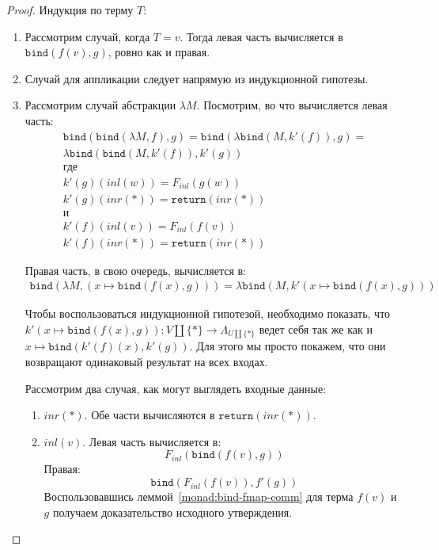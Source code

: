 \begin{proof}
  Индукция по терму $T$:
  \begin{enumerate}
    \item Рассмотрим случай, когда $T = v$. Тогда левая часть вычисляется в $\texttt{bind}(f(v), g)$, ровно как и правая.
    \item Случай для аппликации следует напрямую из индукционной гипотезы.
    \item Рассмотрим случай абстракции $\lambda M$. Посмотрим, во что вычисляется левая часть:
    \begin{gather*}
      \texttt{bind}(\texttt{bind}(\lambda M, f), g) = \texttt{bind}(\lambda \texttt{bind}(M, k'(f)), g) = \\
      \lambda \texttt{bind}(\texttt{bind}(M, k'(f)), k'(g)) \\
      \text{где} \\
      k'(g)(inl(w)) = F_{inl}(g(w)) \\
      k'(g)(inr(*)) = \texttt{return}(inr(*)) \\
      \text{и} \\
      k'(f)(inl(v)) = F_{inl}(f(v)) \\
      k'(f)(inr(*)) = \texttt{return}(inr(*))
    \end{gather*}

    Правая часть, в свою очередь, вычисляется в:
    \begin{gather*}
      \texttt{bind}(\lambda M, (x \mapsto \texttt{bind}(f(x), g))) = \lambda \texttt{bind}(M, k'(x \mapsto \texttt{bind}(f(x), g)))
    \end{gather*}

    Чтобы воспользоваться индукционной гипотезой, необходимо показать, что $k'(x \mapsto \texttt{bind}(f(x), g)) : V \coprod \{*\} \to \Lambda_{U \coprod \{*\}}$ ведет себя так же как и $x \mapsto \texttt{bind}(k'(f)(x), k'(g))$. Для этого мы просто покажем, что они возвращают одинаковый результат на всех входах.

    Рассмотрим два случая, как могут выглядеть входные данные:
    \begin{enumerate}
      \item $inr(*)$. Обе части вычисляются в $\texttt{return}(inr(*))$.
      \item $inl(v)$. Левая часть вычисляется в: $$ F_{inl}(\texttt{bind}(f(v), g)) $$
      Правая: $$\texttt{bind}(F_{inl}(f(v)), f'(g))$$
      Воспользовавшись леммой~\ref{monad:bind-fmap-comm} для терма $f(v)$ и $g$ получаем доказательство исходного утверждения. \qedhere
    \end{enumerate}
  \end{enumerate}
\end{proof}


